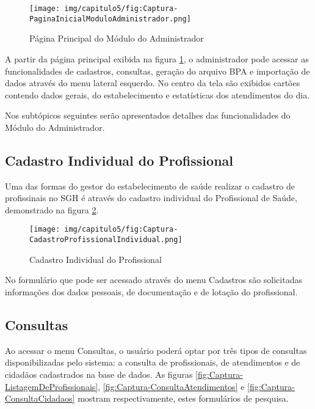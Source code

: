 \begin{figure}[H]
    \centering
     \caption{Página Principal do Módulo do Administrador}
    \texttt{[image: img/capitulo5/fig:Captura-PaginaInicialModuloAdministrador.png]}
    \label{fig:Captura-PaginaInicialModuloAdministrador}
\end{figure}

A partir da página principal exibida na figura \ref{fig:Captura-PaginaInicialModuloAdministrador}, o administrador pode acessar as funcionalidades de cadastros, consultas, geração do arquivo BPA e importação de dados através do menu lateral esquerdo. No centro da tela são exibidos cartões contendo dados gerais, do estabelecimento e estatísticas dos atendimentos do dia.

Nos subtópicos seguintes serão apresentados detalhes das funcionalidades do Módulo do Administrador.

\subsection{Cadastro Individual do Profissional}

Uma das formas do gestor do estabelecimento de saúde realizar o cadastro de profissinais no SGH é através do cadastro individual do Profissional de Saúde, demonstrado na figura \ref{fig:Captura-CadastroProfissionalIndividual}.

\begin{figure}[H]
    \centering
     \caption{Cadastro Individual do Profissional}
    \texttt{[image: img/capitulo5/fig:Captura-CadastroProfissionalIndividual.png]}
    \label{fig:Captura-CadastroProfissionalIndividual}
\end{figure}

No formulário que pode ser acessado através do menu Cadastros são solicitadas informações dos dados pessoais, de documentação e de lotação do profissional.

\subsection{Consultas}

Ao acessar o menu Consultas, o usuário poderá optar por três tipos de consultas disponibilizadas pelo sistema: a consulta de profissionais, de atendimentos e de cidadãos cadastrados na base de dados. As figuras \ref{fig:Captura-ListagemDeProfissionais}, \ref{fig:Captura-ConsultaAtendimentos} e \ref{fig:Captura-ConsultaCidadaos} mostram respectivamente, estes formulários de pesquisa.

